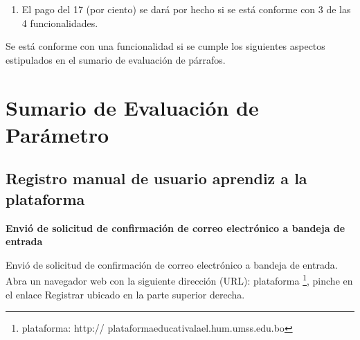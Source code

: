 \begin{enumerate}
\begin{itemize}
\end{itemize}

\item El pago del 17 (por ciento) se dará por hecho si se está conforme 
con 3 de las 4 funcionalidades.

\end{enumerate}

Se está conforme con una funcionalidad si se cumple los siguientes aspectos
estipulados en el sumario de evaluación de párrafos.

\section{Sumario de Evaluación de Parámetro}

\subsection{Registro manual de usuario aprendiz a la plataforma}

\textbf{Envió de solicitud de confirmación de correo electrónico a
bandeja de entrada}

Envió de solicitud de confirmación de correo electrónico a bandeja
de entrada. Abra un navegador web con la siguiente dirección (URL): plataforma
\footnote{plataforma: http:// plataformaeducativalael.hum.umss.edu.bo}, pinche en 
el enlace Registrar ubicado en la parte superior derecha.

